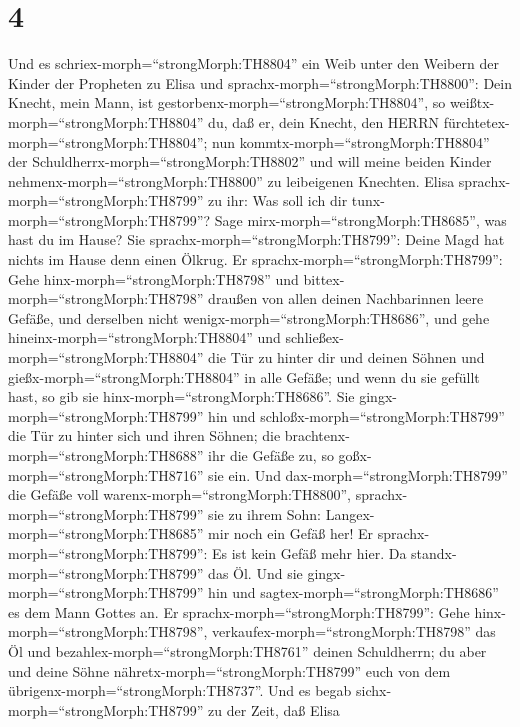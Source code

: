 \hypertarget{section-3}{%
\section{4}\label{section-3}}

 Und es schriex-morph=``strongMorph:TH8804'' ein Weib unter
den Weibern der Kinder der Propheten zu Elisa und
sprachx-morph=``strongMorph:TH8800'': Dein Knecht, mein Mann, ist
gestorbenx-morph=``strongMorph:TH8804'', so
weißtx-morph=``strongMorph:TH8804'' du, daß er, dein Knecht, den HERRN
fürchtetex-morph=``strongMorph:TH8804''; nun
kommtx-morph=``strongMorph:TH8804'' der
Schuldherrx-morph=``strongMorph:TH8802'' und will meine beiden Kinder
nehmenx-morph=``strongMorph:TH8800'' zu leibeigenen Knechten.
 Elisa sprachx-morph=``strongMorph:TH8799'' zu ihr: Was soll
ich dir tunx-morph=``strongMorph:TH8799''? Sage
mirx-morph=``strongMorph:TH8685'', was hast du im Hause? Sie
sprachx-morph=``strongMorph:TH8799'': Deine Magd hat nichts im Hause
denn einen Ölkrug.  Er sprachx-morph=``strongMorph:TH8799'':
Gehe hinx-morph=``strongMorph:TH8798'' und
bittex-morph=``strongMorph:TH8798'' draußen von allen deinen
Nachbarinnen leere Gefäße, und derselben nicht
wenigx-morph=``strongMorph:TH8686'',  und gehe
hineinx-morph=``strongMorph:TH8804'' und
schließex-morph=``strongMorph:TH8804'' die Tür zu hinter dir und deinen
Söhnen und gießx-morph=``strongMorph:TH8804'' in alle Gefäße; und wenn
du sie gefüllt hast, so gib sie hinx-morph=``strongMorph:TH8686''.
 Sie gingx-morph=``strongMorph:TH8799'' hin und
schloßx-morph=``strongMorph:TH8799'' die Tür zu hinter sich und ihren
Söhnen; die brachtenx-morph=``strongMorph:TH8688'' ihr die Gefäße zu, so
goßx-morph=``strongMorph:TH8716'' sie ein.  Und
dax-morph=``strongMorph:TH8799'' die Gefäße voll
warenx-morph=``strongMorph:TH8800'',
sprachx-morph=``strongMorph:TH8799'' sie zu ihrem Sohn:
Langex-morph=``strongMorph:TH8685'' mir noch ein Gefäß her! Er
sprachx-morph=``strongMorph:TH8799'': Es ist kein Gefäß mehr hier. Da
standx-morph=``strongMorph:TH8799'' das Öl.  Und sie
gingx-morph=``strongMorph:TH8799'' hin und
sagtex-morph=``strongMorph:TH8686'' es dem Mann Gottes an. Er
sprachx-morph=``strongMorph:TH8799'': Gehe
hinx-morph=``strongMorph:TH8798'',
verkaufex-morph=``strongMorph:TH8798'' das Öl und
bezahlex-morph=``strongMorph:TH8761'' deinen Schuldherrn; du aber und
deine Söhne nähretx-morph=``strongMorph:TH8799'' euch von dem
übrigenx-morph=``strongMorph:TH8737''.  Und es begab
sichx-morph=``strongMorph:TH8799'' zu der Zeit, daß Elisa
